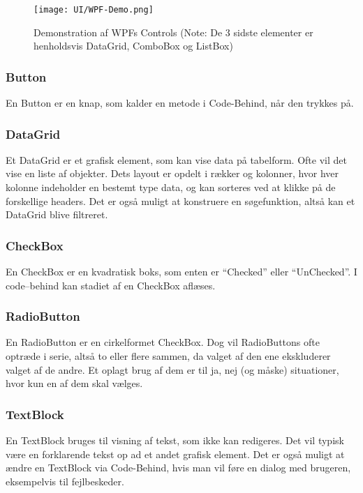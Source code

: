\begin{wrapfigure}[15]{R}{0.5\textwidth}
    \label{img:wpfdemo}
    \vspace{-30pt}
    \begin{center}
        \texttt{[image: UI/WPF-Demo.png]}
    \end{center}
    \vspace{-15pt}
    \caption{Demonstration af WPFs Controls (Note: De 3 sidste elementer er henholdsvis DataGrid, ComboBox og ListBox)}
    \vspace{-15pt}
\end{wrapfigure}

\subsubsection*{Button}
En Button er en knap, som kalder en metode i Code-Behind, når den trykkes på.

\subsubsection*{DataGrid}
Et DataGrid er et grafisk element, som kan vise data på tabelform.
Ofte vil det vise en liste af objekter.
Dets layout er opdelt i rækker og kolonner, hvor hver kolonne indeholder en bestemt type data, og kan sorteres ved at klikke på de forskellige headers.
Det er også muligt at konstruere en søgefunktion, altså kan et DataGrid blive filtreret.

\subsubsection*{CheckBox}
En CheckBox er en kvadratisk boks, som enten er ``Checked'' eller ``UnChecked''.
I code--behind kan stadiet af en CheckBox aflæses.

\subsubsection*{RadioButton}
En RadioButton er en cirkelformet CheckBox.
Dog vil RadioButtons ofte optræde i serie, altså to eller flere sammen, da valget af den ene ekskluderer valget af de andre. 
Et oplagt brug af dem er til ja, nej (og måske) situationer, hvor kun en af dem skal vælges.

\subsubsection*{TextBlock}
En TextBlock bruges til visning af tekst, som ikke kan redigeres.
Det vil typisk være en forklarende tekst op ad et andet grafisk element.
Det er også muligt at ændre en TextBlock via Code-Behind, hvis man vil føre en dialog med brugeren, eksempelvis til fejlbeskeder.

